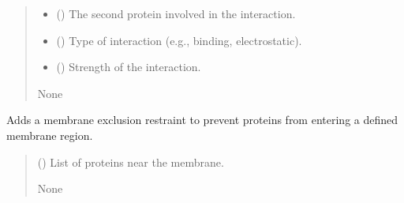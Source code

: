 \documentclass[letterpaper,10pt,english]{sphinxmanual}
\begin{document}
\begin{fulllineitems}
\begin{fulllineitems}
\begin{quote}
\begin{description}
\begin{itemize}
\item {} 
\sphinxAtStartPar
{} ({\hyperref[\detokenize{src:src.Protein_Class.Protein}]{}}) \textendash{} The second protein involved in the interaction.

\item {} 
\sphinxAtStartPar
{} () \textendash{} Type of interaction (e.g., binding, electrostatic).

\item {} 
\sphinxAtStartPar
{} () \textendash{} Strength of the interaction.

\end{itemize}

\sphinxAtStartPar
None

\end{description}\end{quote}

\end{fulllineitems}


\begin{fulllineitems}
\label{\detokenize{src:src.System_Class.System.add_membrane_exclusion_restraint}}
\pysigstartsignatures
{}
\pysigstopsignatures
\sphinxAtStartPar
Adds a membrane exclusion restraint to prevent proteins from entering a defined membrane region.
\begin{quote}\begin{description}
\sphinxAtStartPar
{} () \textendash{} List of proteins near the membrane.

\sphinxAtStartPar
None

\end{description}\end{quote}

\end{fulllineitems}


\end{fulllineitems}
\end{document}
